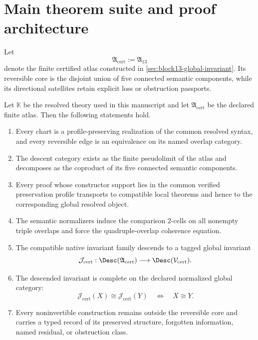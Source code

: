 \section{Main theorem suite and proof architecture}
\label{sec:block14-main-suite}

Let
\[
 \mathfrak A_{\mathrm{cert}}:=\mathfrak A_{13}
\]
denote the finite certified atlas constructed in \cref{sec:block13-global-invariant}.  Its reversible core is the disjoint union of five connected semantic components, while its directional satellites retain explicit loss or obstruction passports.

\begin{theorem}
\label{thm:block14-main}
Let \(\mathbb K\) be the resolved theory used in this manuscript and let \(\mathfrak A_{\mathrm{cert}}\) be the declared finite atlas.  Then the following statements hold.
\begin{enumerate}
\item Every chart is a profile-preserving realization of the common resolved syntax, and every reversible edge is an equivalence on its named overlap category.
\item The descent category exists as the finite pseudolimit of the atlas and decomposes as the coproduct of its five connected semantic components.
\item Every proof whose constructor support lies in the common verified preservation profile transports to compatible local theorems and hence to the corresponding global resolved object.
\item The semantic normalizers induce the comparison 2-cells on all nonempty triple overlaps and force the quadruple-overlap coherence equation.
\item The compatible native invariant family descends to a tagged global invariant
\[
 \mathcal J_{\mathrm{cert}}:
 \Desc(\mathfrak A_{\mathrm{cert}})
 \longrightarrow
 \Desc(\mathcal V_{\mathrm{cert}}).
\]
\item The descended invariant is complete on the declared normalized global category:
\[
 \mathcal J_{\mathrm{cert}}(X)\cong
 \mathcal J_{\mathrm{cert}}(Y)
 \quad\Longleftrightarrow\quad
 X\cong Y.
\]
\item Every noninvertible construction remains outside the reversible core and carries a typed record of its preserved structure, forgotten information, named residual, or obstruction class.
\end{enumerate}
\end{theorem}

